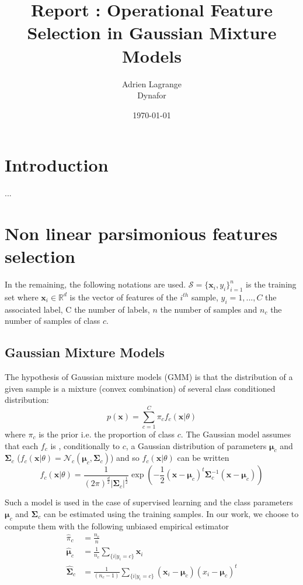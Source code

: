 \documentclass[a4paper,11pt,DIV=16]{scrartcl}
\title{Report : Operational Feature Selection in Gaussian Mixture Models}
\author{Adrien Lagrange
\\
\small{Dynafor}}
\date{\today}
\begin{document}
\maketitle

\section{Introduction}

...


\section{Non linear parsimonious features selection}

In the remaining, the following notations are used. $\mathcal{S} = \{\mathbf{x}_i,y_i\}_{i=1}^{n}$ is the training set where $\mathbf{x}_i \in \mathbb{R}^d$ is the vector of features of the $i^{th}$ sample, $y_i = 1,...,C$ the associated label, C the number of labels, $n$ the number of samples and $n_c$ the number of samples of class $c$.

    \subsection{Gaussian Mixture Models}

    The hypothesis of Gaussian mixture models (GMM) is that the distribution of a given sample is a mixture (convex combination) of several class conditioned distribution:
    \begin{equation}
        p(\mathbf{x}) = \sum_{c=1}^{C} \pi_c f_c(\mathbf{x}|\theta)
    \end{equation}
    where $\pi_c$ is the prior i.e. the proportion of class $c$.
    The Gaussian model assumes that each $f_c$ is , conditionally to $c$, a Gaussian distribution of parameters $\boldsymbol{\mu}_c$ and $\boldsymbol{\Sigma}_c$ ($f_c(\mathbf{x}|\theta) = \mathcal{N}_c(\boldsymbol{\mu}_c, \boldsymbol{\Sigma}_c)$) and so $f_c(\mathbf{x}|\theta)$ can be written
    \begin{equation*}
        f_c(\mathbf{x}|\theta) = \frac{1}{(2\pi)^{\frac{d}{2}} |\boldsymbol{\Sigma}_c|^{\frac{1}{2}}} \exp \left( -\frac{1}{2} (\mathbf{x} - \boldsymbol{\mu}_c)^t \boldsymbol{\Sigma}_c^{-1} (\mathbf{x} - \boldsymbol{\mu}_c) \right)
    \end{equation*}

    Such a model is used in the case of supervised learning and the class parameters $\boldsymbol{\mu}_c$ and $\boldsymbol{\Sigma}_c$ can be estimated using the training samples. In our work, we choose to compute them with the following unbiased empirical estimator
    \begin{align}
        \hat{\pi}_c &= \frac{n_c}{n}\\
        \hat{\boldsymbol{\mu}}_c &= \frac{1}{n_c} \sum_{\{i|y_i = c\}} \mathbf{x}_i \\
        \hat{\boldsymbol{\Sigma}}_c &= \frac{1}{(n_c - 1)} \sum_{\{i|y_i = c\}} (\mathbf{x}_i - \boldsymbol{\mu}_c) (\boldsymbol{}x_i - \boldsymbol{\mu}_c)^t
    \end{align}
\end{document}
